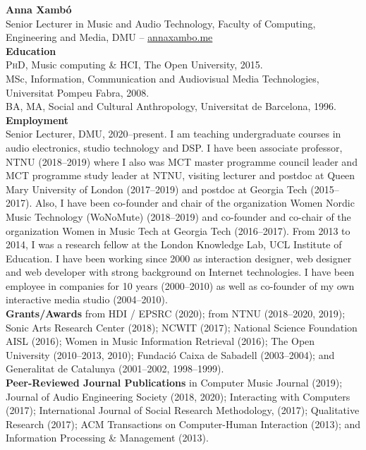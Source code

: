 \documentclass[10pt, a4paper]{article}
\begin{document}

{\textbf{Anna Xambó}}\\ 
Senior Lecturer in Music and Audio Technology, Faculty of Computing, Engineering and Media, DMU -- \href{http://annaxambo.me/}{annaxambo.me}\\

{\textbf{Education}}\\
\textsc{PhD}, Music computing \& HCI, The Open University, 2015.\\
MSc, Information, Communication and Audiovisual Media Technologies, Universitat Pompeu Fabra, 2008.\\
BA, MA, Social and Cultural Anthropology, Universitat de Barcelona, 1996.\\

{\textbf{Employment}}\\
Senior Lecturer, DMU, 2020--present. I am teaching undergraduate courses in audio electronics, studio technology and DSP. 
I have been associate professor, NTNU (2018--2019) where I also was MCT master programme council leader and MCT programme study leader at NTNU, visiting lecturer and postdoc at Queen Mary University of London (2017--2019) and postdoc at Georgia Tech (2015--2017). Also, I have been co-founder and chair of the organization Women Nordic Music Technology (WoNoMute) (2018--2019) and co-founder and co-chair of the organization Women in Music Tech at Georgia Tech (2016--2017). From 2013 to 2014, I was a research fellow at the London Knowledge Lab, UCL Institute of Education.
I have been working since 2000 as interaction designer, web designer and web developer with strong background on Internet technologies. I have been employee in companies for 10 years (2000--2010) as well as co-founder of my own interactive media studio (2004--2010).\\

{\textbf{Grants/Awards}} from HDI / EPSRC (2020); from NTNU (2018--2020, 2019); Sonic Arts Research Center (2018); NCWIT (2017); National Science Foundation AISL (2016); Women in Music Information Retrieval (2016); The Open University (2010--2013, 2010); Fundació Caixa de Sabadell (2003--2004); and Generalitat de Catalunya (2001--2002, 1998--1999).\\

{\textbf{Peer-Reviewed Journal Publications}} in Computer Music Journal (2019); Journal of Audio Engineering Society (2018, 2020); Interacting with Computers (2017); International Journal of Social Research Methodology, (2017); Qualitative Research (2017); ACM Transactions on Computer-Human Interaction (2013); and Information Processing \& Management (2013).\\
\end{document}
